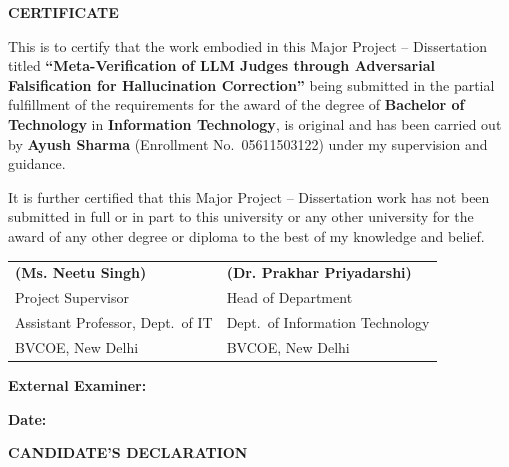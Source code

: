 \documentclass[12pt, a4paper]{report}
\begin{document}
\newpage
\thispagestyle{empty}
\setcounter{page}{2}

\begin{center}
    {\fontsize{16}{20}\bfseries CERTIFICATE}
\end{center}
\vspace{1cm}
\onehalfspacing

\noindent
This is to certify that the work embodied in this Major Project -- Dissertation titled
\textbf{``Meta-Verification of LLM Judges through Adversarial Falsification for Hallucination Correction''} being submitted in the partial fulfillment of the
requirements for the award of the degree of \textbf{Bachelor of Technology} in
\textbf{Information Technology}, is original and has been carried out by
\textbf{Ayush Sharma} (Enrollment No.\ 05611503122) under my supervision and
guidance.

\vspace{0.5cm}
\noindent
It is further certified that this Major Project -- Dissertation work has not been
submitted in full or in part to this university or any other university for the award
of any other degree or diploma to the best of my knowledge and belief.

\vspace{2.5cm}
\noindent
\begin{tabular}{p{} p{}}
\textbf{(Ms. Neetu Singh)} & \textbf{(Dr. Prakhar Priyadarshi)} \\
Project Supervisor                 & Head of Department \\
Assistant Professor, Dept.\ of IT            & Dept.\ of Information Technology \\
BVCOE, New Delhi                   & BVCOE, New Delhi \\
\end{tabular}

\vspace{2cm}
\noindent
\textbf{External Examiner:} \hrulefill

\vspace{0.5cm}
\noindent
\textbf{Date:} \hrulefill

\newpage
\thispagestyle{empty}
\begin{center}
    {\fontsize{16}{20}\bfseries CANDIDATE'S DECLARATION}
\end{center}
\vspace{1cm}
\doublespacing
\end{document}
